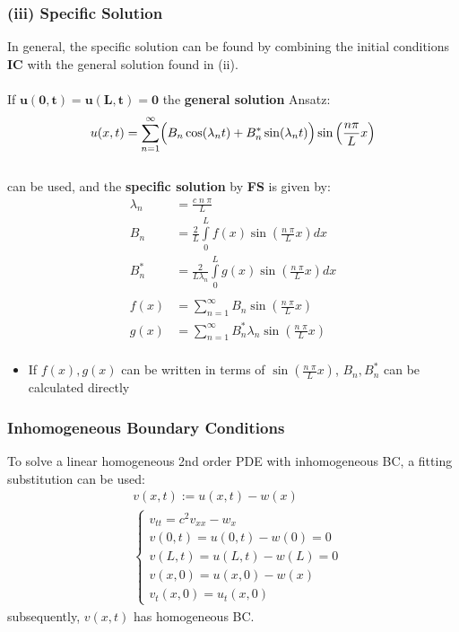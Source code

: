\subsubsection{(iii) Specific Solution}\label{pde/1dwave/specificSolution}
In general, the specific solution can be found by combining the initial conditions \textbf{IC}
with the general solution found in (ii).\\\hbox{}\\
If $\mathbf{u(0,t)=u(L,t)= 0}$ the \textbf{general solution} Ansatz:
\begin{equation*}
    u(x,t)=\sum\limits_{n=1}^{\infty}
    \Bigl( B_n \cos(\lambda _n t)+B_n^* \sin(\lambda_n t)\Bigr) \sin
    \left(\frac{n \pi}{L}x \right)
\end{equation*}\\
can be used, and the \textbf{specific solution} by \textbf{FS} is given by:
\begin{align*}
    \lambda_n & =\frac{c\; n\; \pi}{L}                                               \\
    B_n       & =\frac{2}{L}\int\limits_0^L f(x)\sin(\frac{n\;\pi}{L}x)dx            \\
    B_n^*     & =\frac{2}{L\lambda_n} \int\limits_0^L g(x) \sin(\frac{n\;\pi}{L}x)dx \\\\
    f(x)      & =\sum\limits_{n=1}^{\infty} B_n \sin(\frac{n\;\pi}{L}x)              \\
    g(x)      & =\sum\limits_{n=1}^{\infty} B_n^* \lambda_n \sin(\frac{n\;\pi}{L}x)  \\
\end{align*}
\begin{itemize}
    \item If $f(x),g(x)$ can be written in terms of $\sin(\frac{n\;\pi}{L}x)$, $B_n, B_n^*$
          can be calculated directly
\end{itemize}

\subsubsection{Inhomogeneous Boundary Conditions}
To solve a linear homogeneous 2nd order PDE with inhomogeneous BC, a fitting substitution can be used:
\begin{align*}
     & v(x,t):= u(x,t) -w(x) \\
     & \begin{cases}
           v_{tt}=c^2v_{xx}-w_x \\
           v(0,t)=u(0,t)-w(0)=0 \\
           v(L,t)=u(L,t)-w(L)=0 \\
           v(x,0)=u(x,0)-w(x)   \\
           v_t(x,0)=u_t(x,0)
       \end{cases}
\end{align*}
subsequently, $v(x,t)$ has homogeneous BC.

